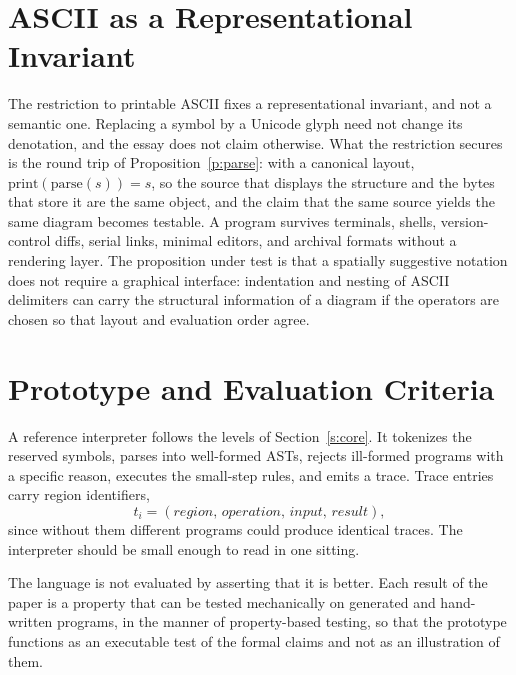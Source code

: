 \documentclass[11pt]{article}
\begin{document}
\section{ASCII as a Representational Invariant}

The restriction to printable ASCII fixes a representational invariant, and not a semantic one. Replacing a symbol by a Unicode glyph need not change its denotation, and the essay does not claim otherwise. What the restriction secures is the round trip of Proposition~\ref{p:parse}: with a canonical layout, $\mathrm{print}(\mathrm{parse}(s))=s$, so the source that displays the structure and the bytes that store it are the same object, and the claim that the same source yields the same diagram becomes testable. A program survives terminals, shells, version-control diffs, serial links, minimal editors, and archival formats without a rendering layer. The proposition under test is that a spatially suggestive notation does not require a graphical interface: indentation and nesting of ASCII delimiters can carry the structural information of a diagram if the operators are chosen so that layout and evaluation order agree.

\section{Prototype and Evaluation Criteria}\label{s:proto}

A reference interpreter follows the levels of Section~\ref{s:core}. It tokenizes the reserved symbols, parses into well-formed ASTs, rejects ill-formed programs with a specific reason, executes the small-step rules, and emits a trace. Trace entries carry region identifiers,
\[
t_i=(\mathit{region},\,\mathit{operation},\,\mathit{input},\,\mathit{result}),
\]
since without them different programs could produce identical traces. The interpreter should be small enough to read in one sitting.

The language is not evaluated by asserting that it is better. Each result of the paper is a property that can be tested mechanically on generated and hand-written programs, in the manner of property-based testing, so that the prototype functions as an executable test of the formal claims and not as an illustration of them.
\end{document}
